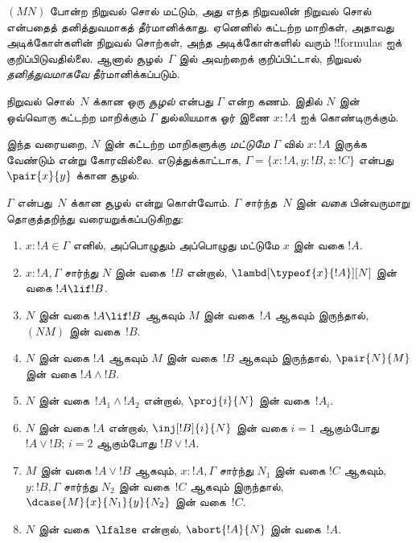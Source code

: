 \documentclass[../../../include/open-logic-section]{subfiles}
\begin{document}


$(MN)$ போன்ற நிறுவல் சொல் மட்டும், அது எந்த
நிறுவலின் நிறுவல் சொல் என்பதைத் தனித்துவமாகத்
தீர்மானிக்காது. ஏனெனில் கட்டற்ற மாறிகள், அதாவது
அடிக்கோள்களின் நிறுவல் சொற்கள், அந்த அடிக்கோள்களில்
வரும் !!{formula}s ஐக் குறிப்பிடுவதில்லை. ஆனால்
சூழல்~$\Gamma$ இல் அவற்றைக் குறிப்பிட்டால்,
நிறுவல் \emph{தனித்துவமாகவே} தீர்மானிக்கப்படும்.

\begin{defn}
நிறுவல் சொல்~$N$ க்கான ஒரு \emph{சூழல்}
என்பது $\Gamma$ என்ற கணம். இதில் $N$ இன்
ஒவ்வொரு கட்டற்ற மாறிக்கும் $\Gamma$ துல்லியமாக
ஓர் இணை $x : !A$ ஐக் கொண்டிருக்கும்.
\end{defn}

இந்த வரையறை, $N$ இன் கட்டற்ற மாறிகளுக்கு
\emph{மட்டுமே} $\Gamma$ வில் $x:!A$
இருக்க வேண்டும் என்று கோரவில்லை.
எடுத்துக்காட்டாக, $\Gamma =
\{x:!A, y:!B, z:!C\}$ என்பது
$\pair{x}{y}$ க்கான சூழல்.

\begin{defn}
  $\Gamma$ என்பது~$N$ க்கான சூழல் என்று கொள்வோம்.
  $\Gamma$ சார்ந்த~$N$ இன் \emph{வகை}
  பின்வருமாறு தொகுத்தறிந்து வரையறுக்கப்படுகிறது:
  \begin{enumerate}
  \item $x:!A \in \Gamma$ எனில், அப்பொழுதும்
  அப்பொழுது மட்டுமே $x$ இன் வகை $!A$.
  \item $x:!A, \Gamma$ சார்ந்து $N$ இன் வகை~$!B$
  என்றால், $\lambd[\typeof{x}{!A}][N]$ இன் வகை
  $!A \lif !B$.
  \item $N$ இன் வகை $!A \lif !B$ ஆகவும்
  $M$ இன் வகை~$!A$ ஆகவும் இருந்தால், $(NM)$ இன்
  வகை~$!B$.
  \item $N$ இன் வகை $!A$ ஆகவும்
  $M$ இன் வகை~$!B$ ஆகவும் இருந்தால்,
  $\pair{N}{M}$ இன் வகை $!A \land !B$.
  \item $N$ இன் வகை~$!A_1 \land !A_2$ என்றால்,
  $\proj{i}{N}$ இன் வகை~$!A_i$.
  \item $N$ இன் வகை $!A$ என்றால்,
    $\inj[!B]{i}{N}$ இன் வகை $i=1$ ஆகும்போது
    $!A \lor !B$; $i=2$ ஆகும்போது $!B \lor
    !A$.
  \item $M$ இன் வகை $!A \lor !B$ ஆகவும்,
  $x:!A, \Gamma$ சார்ந்து $N_1$ இன் வகை $!C$
  ஆகவும், $y:!B,
  \Gamma$ சார்ந்து $N_2$ இன் வகை~$!C$
  ஆகவும் இருந்தால், $\dcase{M}{x}{N_1}{y}{N_2}$
  இன் வகை~$!C$.
  \item $N$ இன் வகை~$\lfalse$ என்றால்,
    $\abort{!A}{N}$ இன் வகை~$!A$.
  \end{enumerate}
\end{defn}
\end{document}
